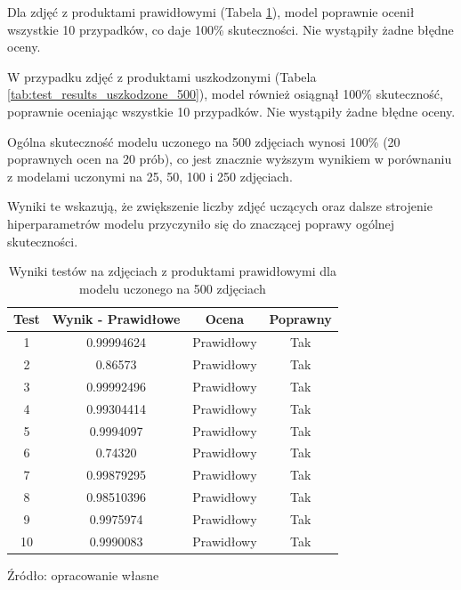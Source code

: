 Dla zdjęć z produktami prawidłowymi (Tabela \ref{tab:test_results_prawidlowe_500}), model poprawnie ocenił wszystkie 10 przypadków, co daje 100\% skuteczności. Nie wystąpiły żadne błędne oceny.

W przypadku zdjęć z produktami uszkodzonymi (Tabela \ref{tab:test_results_uszkodzone_500}), model również osiągnął 100\% skuteczność, poprawnie oceniając wszystkie 10 przypadków. Nie wystąpiły żadne błędne oceny.

Ogólna skuteczność modelu uczonego na 500 zdjęciach wynosi 100\% (20 poprawnych ocen na 20 prób), co jest znacznie wyższym wynikiem w porównaniu z modelami uczonymi na 25, 50, 100 i 250 zdjęciach.

Wyniki te wskazują, że zwiększenie liczby zdjęć uczących oraz dalsze strojenie hiperparametrów modelu przyczyniło się do znaczącej poprawy ogólnej skuteczności. 

\begin{table}[H]
\centering
\caption{Wyniki testów na zdjęciach z produktami prawidłowymi dla modelu uczonego na 500 zdjęciach}
\begin{tabular}{|c|c|c|c|}
\hline
\textbf{Test} & \textbf{Wynik - Prawidłowe} & \textbf{Ocena} & \textbf{Poprawny} \\ \hline
1  & 0.99994624 & Prawidłowy & Tak  \\ \hline
2  & 0.86573 & Prawidłowy & Tak \\ \hline
3  & 0.99992496 & Prawidłowy & Tak \\ \hline
4  & 0.99304414 & Prawidłowy & Tak \\ \hline
5  & 0.9994097 & Prawidłowy & Tak \\ \hline
6  & 0.74320 & Prawidłowy & Tak  \\ \hline
7  & 0.99879295 & Prawidłowy & Tak  \\ \hline
8  & 0.98510396 & Prawidłowy & Tak \\ \hline
9  & 0.9975974 & Prawidłowy & Tak \\ \hline
10  & 0.9990083 & Prawidłowy & Tak \\ \hline
\end{tabular}
\begin{center}
\footnotesize{Źródło: opracowanie własne}
\end{center}
\label{tab:test_results_prawidlowe_500}
\end{table}

